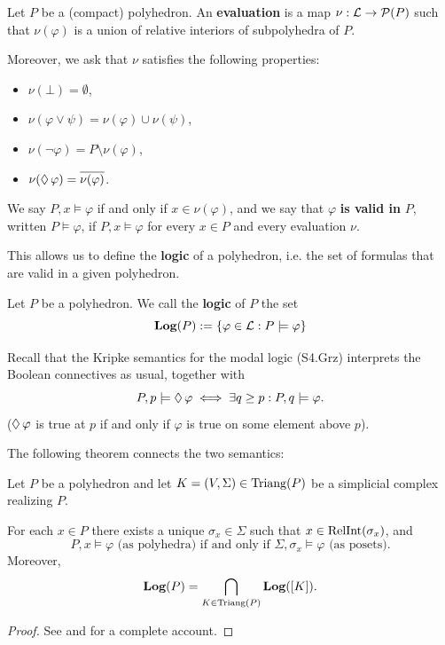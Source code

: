 \begin{definition}
    Let $P$ be a (compact) polyhedron. An \textbf{evaluation} is a map $\nu :\operatorname{\mathcal{L}} \to \operatorname{\mathcal{P}}(P)$ such that $\nu(\varphi)$ is a union of relative interiors of subpolyhedra of $P$.

    Moreover, we ask that $\nu$ satisfies the following properties:
    \begin{itemize}
        \item $\nu(\bot)=\emptyset$,
        \item $\nu(\varphi\vee\psi)=\nu(\varphi)\cup\nu(\psi)$,
        \item $\nu(\lnot\varphi)=P\setminus \nu(\varphi)$,
        \item $\nu(\operatorname{\Diamond}\varphi)=\overline{\nu(\varphi)}$.
    \end{itemize}
    We say $P,x\models \varphi$ if and only if $x\in \nu(\varphi)$, 
    and we say that $\varphi$ \textbf{is valid in} $P$, 
    written $P\models\varphi$, if $P,x\models \varphi$ 
    for every $x\in P$ and every evaluation $\nu$.
\end{definition}

This allows us to define the \textbf{logic} of a polyhedron, i.e. the set of formulas that are valid in a given polyhedron.
\begin{definition}
    Let $P$ be a polyhedron. We call the \textbf{logic} of $P$ the set
    \[\operatorname{\textbf{Log}}(P):=\left\{ \varphi\in \operatorname{\mathcal{L}}:P\models\varphi \right\}\]
\end{definition}

Recall that the Kripke semantics for the modal logic (S4.Grz) interprets the Boolean connectives as usual, together with
\[P,p\models \operatorname{\Diamond}\varphi\iff \exists q\geq p: P,q\models\varphi.\]
($\operatorname{\Diamond} \varphi$ is true at $p$ if and only if $\varphi$ is true on some element above $p$).

The following theorem connects the two semantics:
\begin{theorem}
    Let $P$ be a polyhedron and let $K=(V,\Sigma)\in \operatorname{Triang}(P)$ be a simplicial complex realizing $P$.

    For each $x\in P$ there exists a unique $\sigma_x\in \Sigma$ such that $x\in \operatorname{RelInt}(\sigma_x)$, and
    \[P,x\models\varphi \text{ (as polyhedra) if and only if }\Sigma,\sigma_x\models\varphi\text{ (as posets)}.\]
    Moreover,
    \[\operatorname{\textbf{Log}}(P)=\bigcap_{K\in \operatorname{Triang}(P)}\operatorname{\textbf{Log}}([K]).\]
\end{theorem}
\begin{proof}
    See \cite{TENCATE} and \cite{DBLP} for a complete account.
\end{proof}

